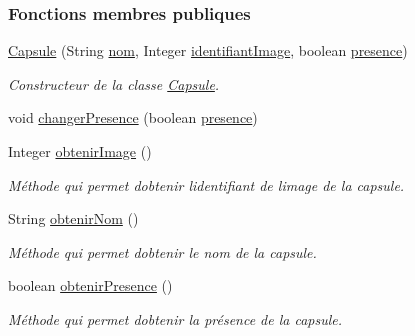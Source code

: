 \subsubsection*{Fonctions membres publiques}
\begin{DoxyCompactItemize}
\item 
\hyperlink{classcom_1_1example_1_1ekawa_1_1_capsule_a7d802ab4d4c4732063c997d1be472186}{Capsule} (String \hyperlink{classcom_1_1example_1_1ekawa_1_1_capsule_a936a082e9bcfdda4bb8fbffd33665cb0}{nom}, Integer \hyperlink{classcom_1_1example_1_1ekawa_1_1_capsule_a05fa50e416ea3a48d6b8dab73174c9d0}{identifiant\+Image}, boolean \hyperlink{classcom_1_1example_1_1ekawa_1_1_capsule_a351ef1f4b4258f4651d24b206fc38a94}{presence})
\begin{DoxyCompactList}\small\item\em Constructeur de la classe \hyperlink{classcom_1_1example_1_1ekawa_1_1_capsule}{Capsule}. \end{DoxyCompactList}\item 
void \hyperlink{classcom_1_1example_1_1ekawa_1_1_capsule_ad9c3e6efb116092fc0dfc26cf8ea6c2f}{changer\+Presence} (boolean \hyperlink{classcom_1_1example_1_1ekawa_1_1_capsule_a351ef1f4b4258f4651d24b206fc38a94}{presence})
\item 
Integer \hyperlink{classcom_1_1example_1_1ekawa_1_1_capsule_ab03475c7f750fd6319a5899da8393252}{obtenir\+Image} ()
\begin{DoxyCompactList}\small\item\em Méthode qui permet d\textquotesingle{}obtenir l\textquotesingle{}identifiant de l\textquotesingle{}image de la capsule. \end{DoxyCompactList}\item 
String \hyperlink{classcom_1_1example_1_1ekawa_1_1_capsule_a56668990154945141a80702633efc123}{obtenir\+Nom} ()
\begin{DoxyCompactList}\small\item\em Méthode qui permet d\textquotesingle{}obtenir le nom de la capsule. \end{DoxyCompactList}\item 
boolean \hyperlink{classcom_1_1example_1_1ekawa_1_1_capsule_a66a878ce2dd20d39cf49d1d66cc5c600}{obtenir\+Presence} ()
\begin{DoxyCompactList}\small\item\em Méthode qui permet d\textquotesingle{}obtenir la présence de la capsule. \end{DoxyCompactList}\end{DoxyCompactItemize}
